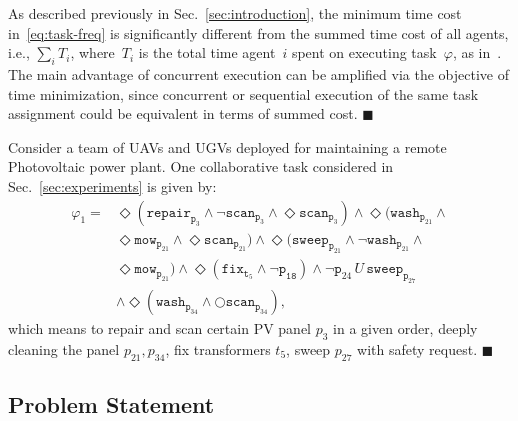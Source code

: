 \begin{remark}\label{rm:cost}
  As described previously in Sec.~\ref{sec:introduction}, the minimum time cost in~\eqref{eq:task-freq} is significantly different from the summed time cost of all agents, i.e.,
$\sum_{i} T_i$, where~$T_i$ is the total time agent~$i$ spent on executing task~$\varphi$,
as in~\cite{kantaros2020stylus, schillinger2018simultaneous, guo2016task, luo2021temporal}.
The main advantage of concurrent execution can be amplified via
the objective of time minimization,
since concurrent or sequential execution of the same task assignment could
be equivalent in terms of summed cost.
\hfill $\blacksquare$
\end{remark}
\begin{example}\label{exp:task}
Consider a team of UAVs and UGVs deployed for maintaining a remote Photovoltaic power plant.
One collaborative task considered in Sec.~\ref{sec:experiments} is given by:
\begin{equation}\label{example:task} 
\begin{aligned}
\varphi_1 = & \Diamond(\texttt{repair}_{\texttt{p}_{3}} \wedge \lnot \texttt{scan}_{\texttt{p}_3} \wedge\Diamond \texttt{scan}_{\texttt{p}_3})
\wedge \Diamond (\texttt{wash}_{\texttt{p}_{21}} \wedge \\
&\Diamond \texttt{mow}_{\texttt{p}_{21}} \wedge \Diamond \texttt{scan}_{\texttt{p}_{21}}) \wedge \Diamond ( \texttt{sweep}_{\texttt{p}_{21}} \wedge \lnot \texttt{wash}_{\texttt{p}_{21}} \wedge\\
& \Diamond \texttt{mow}_{\texttt{p}_{21}}) \wedge \Diamond(\texttt{fix}_{\texttt{t}_5} \wedge \lnot \texttt{p}_{\texttt{18}}) \wedge \lnot \texttt{p}_{24} \,U \, \texttt{sweep}_{\texttt{p}_{27}} \\
&\wedge \Diamond (\texttt{wash}_{\texttt{p}_{34}} \wedge \bigcirc \texttt{scan}_{\texttt{p}_{34}}),
\end{aligned}
\end{equation}
which means to repair and scan certain PV panel $p_3$
in a given order, deeply cleaning the panel $p_{21},p_{34}$, fix transformers
$t_5$, sweep $p_{27}$ with safety request. 
 \hfill $\blacksquare$
\end{example}
\subsection{Problem Statement}\label{subsec:problem-statement}

